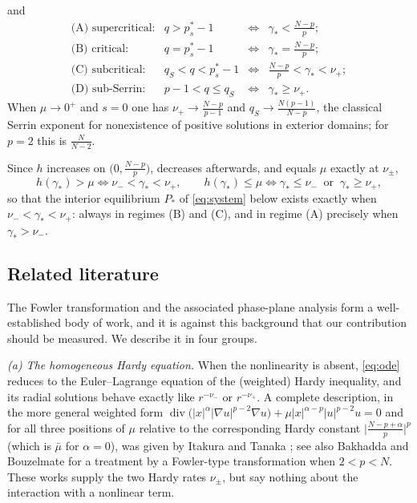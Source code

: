 \documentclass[11pt,reqno]{amsart}
\numberwithin{equation}{section}
\theoremstyle{plain}
\theoremstyle{definition}
\newcommand{\mub}{\bar\mu}
\newcommand{\gs}{\gamma_{*}}
\DeclareMathOperator{\dv}{div}
\begin{document}
and
\begin{equation}\label{eq:regimes}
\begin{array}{llll}
\text{(A) supercritical:} & q>p^{*}_{s}-1 &\iff& \gs<\tfrac{N-p}{p};\\[2pt]
\text{(B) critical:} & q=p^{*}_{s}-1 &\iff& \gs=\tfrac{N-p}{p};\\[2pt]
\text{(C) subcritical:} & q_{S}<q<p^{*}_{s}-1 &\iff& \tfrac{N-p}{p}<\gs<\nu_{+};\\[2pt]
\text{(D) sub-Serrin:} & p-1<q\le q_{S} &\iff& \gs\ge\nu_{+} .
\end{array}
\end{equation}
When $\mu\to0^{+}$ and $s=0$ one has $\nu_{+}\to\frac{N-p}{p-1}$ and
$q_{S}\to\frac{N(p-1)}{N-p}$, the classical Serrin exponent for nonexistence of
positive solutions in exterior domains; for $p=2$ this is $\frac{N}{N-2}$.

Since $h$ increases on $\big(0,\frac{N-p}{p}\big)$, decreases afterwards, and
equals $\mu$ exactly at $\nu_{\pm}$,
\begin{equation}\label{eq:trichotomycases}
h(\gs)>\mu\iff\nu_{-}<\gs<\nu_{+},
\qquad
h(\gs)\le\mu\iff \gs\le\nu_{-}\ \text{ or }\ \gs\ge\nu_{+} ,
\end{equation}
so that the interior equilibrium $P_{*}$ of \eqref{eq:system} below exists
exactly when $\nu_{-}<\gs<\nu_{+}$: always in regimes {\rm(B)} and {\rm(C)},
and in regime {\rm(A)} precisely when $\gs>\nu_{-}$.

\subsection{Related literature}\label{ss:lit}

The Fowler transformation and the associated phase-plane analysis form a
well-established body of work, and it is against this background that our
contribution should be measured. We describe it in four groups.

\smallskip
\noindent\emph{(a) The homogeneous Hardy equation.} When the nonlinearity is
absent, \eqref{eq:ode} reduces to the Euler--Lagrange equation of the (weighted)
Hardy inequality, and its radial solutions behave exactly like $r^{-\nu_{-}}$ or
$r^{-\nu_{+}}$. A complete description, in the more general weighted form
$\dv\big(|x|^{\alpha}|\nabla u|^{p-2}\nabla u\big)
+\mu|x|^{\alpha-p}|u|^{p-2}u=0$ and for all three positions of $\mu$ relative
to the corresponding Hardy constant $\big|\frac{N-p+\alpha}{p}\big|^{p}$
(which is $\mub$ for $\alpha=0$), was given by Itakura and Tanaka
\cite{ItakuraTanaka}; see also Bakhadda and Bouzelmate \cite{BakhaddaBouzelmate}
for a treatment by a Fowler-type transformation when $2<p<N$. These works supply
the two Hardy rates $\nu_{\pm}$, but say nothing about the interaction with a
nonlinear term.
\end{document}
